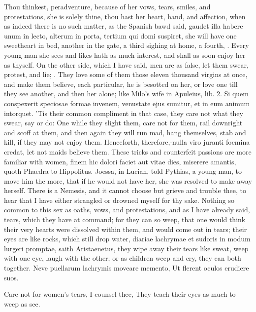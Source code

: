 {Thou thinkest, peradventure, because of her vows, tears, smiles, and
protestations, she is solely thine, thou hast her heart, hand, and
affection, when as indeed there is no such matter, as the Spanish
bawd said, gaudet illa habere unum in lecto, alterum in porta, tertium
qui domi suspiret, she will have one sweetheart in bed, another in the
gate, a third sighing at home, a fourth, \etc{}. Every young man she sees
and likes hath as much interest, and shall as soon enjoy her as
thyself. On the other side, which I have said, men are as false, let
them swear, protest, and lie; . They love some of them those eleven thousand virgins at once,
and make them believe, each particular, he is besotted on her, or love
one till they see another, and then her alone; like Milo's wife in
Apuleius, lib. 2. Si quem conspexerit speciosae formae invenem,
venustate ejus sumitur, et in eum animum intorquet. 'Tis their common
compliment in that case, they care not what they swear, say or do: One
while they slight them, care not for them, rail downright and scoff at
them, and then again they will run mad, hang themselves, stab and kill,
if they may not enjoy them. Henceforth, therefore,-nulla viro juranti
foemina credat, let not maids believe them. These tricks and
counterfeit passions are more familiar with women, finem hic
dolori faciet aut vitae dies, miserere amantis, quoth Phaedra to
Hippolitus. Joessa, in Lucian, told Pythias, a young man, to move
him the more, that if he would not have her, she was resolved to make
away herself. There is a Nemesis, and it cannot choose but grieve and
trouble thee, to hear that I have either strangled or drowned myself
for thy sake. Nothing so common to this sex as oaths, vows, and
protestations, and as I have already said, tears, which they have at
command; for they can so weep, that one would think their very hearts
were dissolved within them, and would come out in tears; their eyes are
like rocks, which still drop water, diariae lachrymae et sudoris in
modum lurgeri promptae, saith  Aristaenetus, they wipe away their
tears like sweat, weep with one eye, laugh with the other; or as
children weep and cry, they can both together.
Neve puellarum lachrymis moveare memento,
Ut flerent oculos erudiere suos.

Care not for women's tears, I counsel thee,
They teach their eyes as much to weep as see.

}
